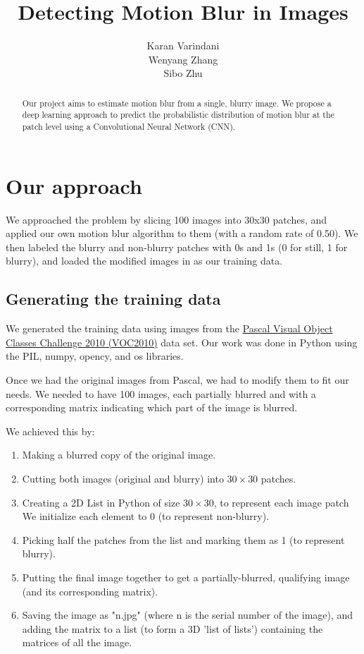 \documentclass{article}
\title{Detecting Motion Blur in Images}
\author{
  Karan Varindani \\
  \And
  Wenyang Zhang \\
  \And
  Sibo Zhu \\
}
\begin{document}
\maketitle

\begin{abstract}
  Our project aims to estimate motion blur from a single, blurry image. 
  We propose a deep learning approach to predict the probabilistic distribution 
  of motion blur at the patch level using a Convolutional Neural Network (CNN).
\end{abstract}

\section{Our approach}
We approached the problem by slicing 100 images into 30x30 patches, and applied
our own motion blur algorithm to them (with a random rate of 0.50). We then labeled 
the blurry and non-blurry patches with 0s and 1s (0 for still, 1 for blurry), and
loaded the modified images in as our training data.
  
\subsection{Generating the training data}
We generated the training data using images from the 
\href{http://host.robots.ox.ac.uk/pascal/VOC/voc2010/}{Pascal Visual Object Classes 
Challenge 2010 (VOC2010)} data set. Our work was done in Python using the PIL, numpy,
opency, and os libraries.

Once we had the original images from Pascal, we had to modify them to fit our needs. We
needed to have 100 images, each partially blurred and with a corresponding matrix
indicating which part of the image is blurred. 

We achieved this by:
\begin{enumerate}
  \item Making a blurred copy of the original image. 
  \item Cutting both images (original and blurry) into $30\times30$ patches.
  \item Creating a 2D List in Python of size $30\times30$, to represent each image patch
  We initialize each element to 0 (to represent non-blurry). 
  \item Picking half the patches from the list and marking them as 1 (to represent 
  blurry).
  \item Putting the final image together to get a partially-blurred, qualifying image 
  (and its corresponding matrix).
  \item Saving the image as "n.jpg" (where n is the serial number of the image), and 
  adding the matrix to a list (to form a 3D 'list of lists') containing the matrices 
  of all the image.
\end{enumerate}
\end{document}
